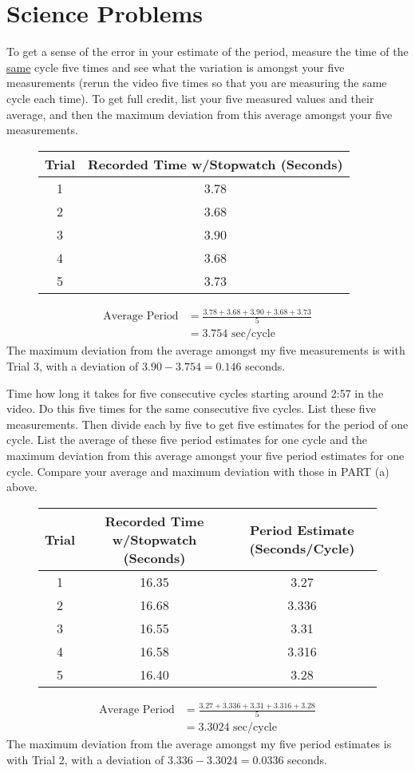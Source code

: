 \documentclass[11pt]{scrartcl}
\theoremstyle{dotlessP}
\theoremstyle{dotlessN}
\begin{document}
\section{Science Problems}
\begin{ques}
	To get a sense of the error in your estimate of the period, measure the time of the \underline{same} cycle five times and see what the variation is amongst your five measurements (rerun the video five times so that you are measuring the same cycle each time). To get full credit, list your five measured values and their average, and then the maximum deviation from this average amongst your five measurements.
\end{ques}
\begin{figure}[H]
	\centering
	\begin{tabular}{c|c}
		Trial & Recorded Time w/Stopwatch (Seconds) \\
		\hline
		1 & 3.78 \\
		2 & 3.68 \\
		3 & 3.90 \\
		4 & 3.68 \\
		5 & 3.73
	\end{tabular}
\end{figure}
\begin{align*}
	\text{Average Period} &= \frac{3.78 + 3.68 + 3.90 + 3.68 + 3.73}{5} \\
								 &= 3.754 \text{ sec/cycle}
\end{align*}
The maximum deviation from the average amongst my five measurements is with Trial 3, with a deviation of $3.90 - 3.754 = 0.146$ seconds.
\begin{ques}
Time how long it takes for five consecutive cycles starting around 2:57 in the video. Do this five times for the same consecutive five cycles. List these five measurements. Then divide each by five to get five estimates for the period of one cycle. List the average of these five period estimates for one cycle and the maximum deviation from this average amongst your five period estimates for one cycle. Compare your average and maximum deviation with those in PART (a) above.
\end{ques}
\begin{figure}[H]
	\centering
	\begin{tabular}{c|c|c}
		Trial & Recorded Time w/Stopwatch (Seconds) & Period Estimate (Seconds/Cycle) \\
		\hline
		1 & 16.35 & 3.27 \\
		2 & 16.68 & 3.336 \\
		3 & 16.55 & 3.31 \\
		4 & 16.58 & 3.316 \\
		5 & 16.40 & 3.28
	\end{tabular}
\end{figure}
\begin{align*}
	\text{Average Period} &= \frac{3.27 + 3.336 + 3.31 + 3.316 + 3.28}{5} \\
						  &= 3.3024 \text{ sec/cycle}
\end{align*}
The maximum deviation from the average amongst my five period estimates is with Trial 2, with a deviation of $3.336 - 3.3024 = 0.0336$ seconds.
\\
\end{document}
